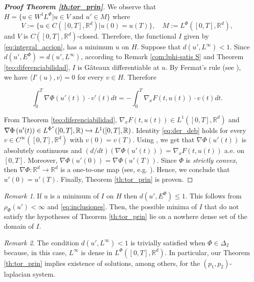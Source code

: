 \documentclass[twoside]{article}
\theoremstyle{remark}
\newtheorem{comentario}{Remark}
\newcommand{\lphi}{L^{\Phi}}
\newcommand{\lpsi}{L^{\Phi^{\star}}}
\newcommand{\ephi}{E^{\Phi}}
\newcommand{\wphi}{W^{1}\lphi}
\newcommand{\rr}{\mathbb{R}}
\renewcommand{\leq}{\leqslant}
\begin{document}
\begin{proof}[\textbf{Proof Theorem \ref{th:tor_prin}}] We observe that $H=\{u\in \wphi | u\in V\text{ and } u'\in M\}$ where 
\[V:=\{u\in C([0,T],\rr^d)|u(0)=u(T)\},\quad M:=\lphi([0,T],\rr^d),\]
and $V$ is $C([0,T],\rr^d)$-closed. Therefore, the functional $I$ given by \eqref{eq:integral_accion}, has a minimum $u$ on  $H$. Suppose that $d(u',L^{\infty})<1$.
Since $d(u',\ephi)=d(u',L^{\infty})$, according to Remark \ref{com:lphi-satis S} and Theorem \ref{teo:diferenciabilidad}, $I$ is G\^ateaux differentiable at $u$. By Fermat's rule (see \cite[Prop. 4.12]{clarke2013functional}), we have $\langle I'(u),v\rangle=0$ for every $v\in H$. Therefore

\begin{equation}\label{eq:der_deb}\int_0^T\nabla\Phi(u'(t))\cdot v'(t)dt=-\int_0^T \nabla_xF(t,u(t))\cdot v(t)dt.\end{equation}

From Theorem \ref{teo:diferenciabilidad}, $\nabla_xF(t,u(t))\in L^1([0,T],\rr^d)$ and  $\nabla\Phi\left(u'(t)\right)\in\linebreak\lpsi([0,T],\rr)\hookrightarrow L^1([0,T],\rr)$.  Identity \eqref{eq:der_deb} holds for every $v\in C^{\infty} ([0,T],\rr^d)$ with $v(0)=v(T)$. Using 
\cite[Fundamental Lemma, p. 6]{mawhin2010critical}, we get that $\nabla\Phi(u'(t))$ is absolutely continuous and $(d/dt)\left(\nabla\Phi(u'(t))\right) = \nabla_xF(t,u(t))$ a.e. on $[0,T]$. Moreover, $\nabla\Phi(u'(0))=\nabla\Phi(u'(T))$. Since  $\Phi$ is \emph{strictly convex},  then  $\nabla\Phi:\mathbb{R}^d\to\mathbb{R}^d$ is a one-to-one map  (see, e.g. \cite[Ex. 4.17, p. 67]{clarke2013functional}). Hence, we conclude that $u'(0)=u'(T)$. Finally, Theorem \ref{th:tor_prin} is proven.
\end{proof}



\begin{comentario} If $u$ is a minimum of $I$ on $H$ then  $d(u',\ephi)\leq 1$. This follows from $\rho_{\Phi}(u')<\infty$ and \eqref{eq:inclusiones}. Then, the possible minima of $I$ that do not satisfy the hypotheses of  Theorem \ref{th:tor_prin} lie on a nowhere dense set of the domain of $I$.
 
\end{comentario}

\begin{comentario} The condition $d(u',L^{\infty})< 1$ is trivially satisfied when $\Phi \in \Delta_2$ because, in this case, $L^{\infty}$ is dense in $\lphi([0,T],\rr^d)$. In particular, our Theorem \ref{th:tor_prin} implies existence of solutions, among others, for the $(p_1,p_2)$-laplacian system. 
\end{comentario}
\end{document}
